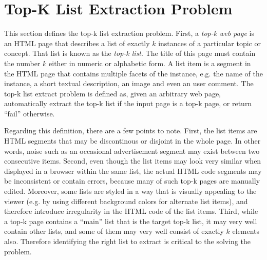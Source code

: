 \section{Top-K List Extraction Problem}
\label{sec:problem}
This section defines the top-k list extraction problem. 
First, a {\em top-k web page} is an HTML page that describes a list of
exactly $k$ instances of a particular topic or concept. 
That list is known as the {\em top-k list}.
The title of this page must contain the number $k$
either in numeric or alphabetic form. A list item is a segment in
the HTML page that contains multiple facets of the instance, e.g.
the name of the instance, a short textual description, an image and
even an user comment. The top-k list extract problem is defined as,
given an arbitrary web page, automatically extract the top-k list 
if the input page is a top-k page, or return ``fail'' otherwise.

Regarding this definition, there are a few points to note. First,
the list items are HTML segments that may be discontinous or disjoint
in the whole page. In other words, noise such as an occasional advertisement
segment may exist between two consecutive items. 
Second, even though the list items may look
very similar when displayed in a browser within the same list, 
the actual HTML code segments may be
inconsistent or contain errors, because many of such top-k pages 
are manually edited. Moreover, some lists are styled in a way that is visually
appealing to the viewer (e.g. by using different background colors for
alternate list items), and therefore introduce irregularity in the
HTML code of the list items. Third, while a top-k page contains a ``main'' list
that is the target top-k list, it may very well contain other lists,
and some of them may very well consist of exactly $k$ elements also. 
Therefore identifying the right list to extract is critical to the solving
the problem. 


%
%
%
%
%
%
%
%
%
%

